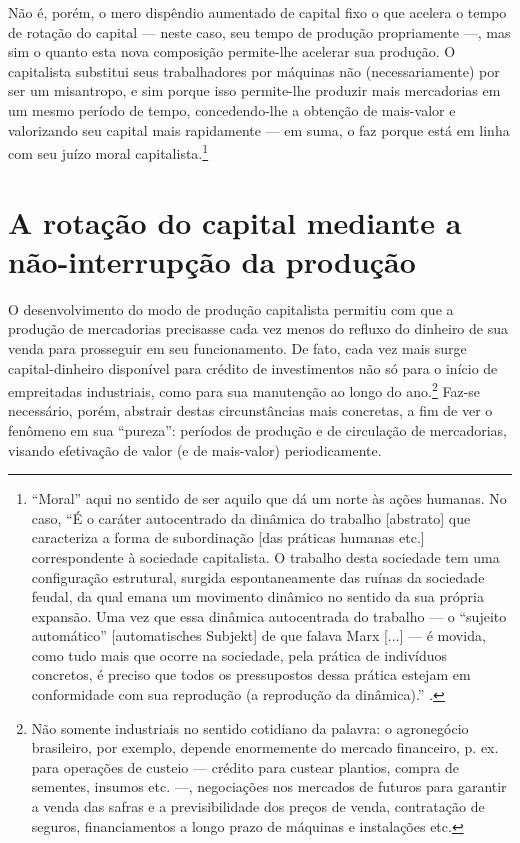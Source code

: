 Não é, porém, o mero dispêndio aumentado de capital fixo o que acelera o tempo de rotação do capital — neste caso, seu tempo de produção propriamente —, mas sim o quanto esta nova composição permite-lhe acelerar sua produção. O capitalista substitui seus trabalhadores por máquinas não (necessariamente) por ser um misantropo, e sim porque isso permite-lhe produzir mais mercadorias em um mesmo período de tempo, concedendo-lhe a obtenção de mais-valor e valorizando seu capital mais rapidamente — em suma, o faz porque está em linha com seu juízo moral capitalista.\footnote{``Moral'' aqui no sentido de ser aquilo que dá um norte às ações humanas. No caso, ``É o caráter autocentrado da dinâmica do trabalho [abstrato] que caracteriza a forma de subordinação [das práticas humanas etc.] correspondente à sociedade capitalista. O trabalho desta sociedade tem uma configuração estrutural, surgida espontaneamente das ruínas da sociedade feudal, da qual emana um movimento dinâmico no sentido da sua própria expansão. Uma vez que essa dinâmica autocentrada do trabalho — o “sujeito automático” [automatisches Subjekt] de que falava Marx [...] — é movida, como tudo mais que ocorre na sociedade, pela prática de indivíduos concretos, é preciso que todos os pressupostos dessa prática estejam em conformidade com sua reprodução (a reprodução da dinâmica).'' \parencite[p. 329]{Medeiros2013a}.}
\section{A rotação do capital mediante a não-interrupção da produção}
O desenvolvimento do modo de produção capitalista permitiu com que a produção de mercadorias precisasse cada vez menos do refluxo do dinheiro de sua venda para prosseguir em seu funcionamento. De fato, cada vez mais surge capital-dinheiro disponível para crédito de investimentos não só para o início de empreitadas industriais, como para sua manutenção ao longo do ano.\footnote{Não somente industriais no sentido cotidiano da palavra: o agronegócio brasileiro, por exemplo, depende enormemente do mercado financeiro, p. ex. para operações de custeio — crédito para custear plantios, compra de sementes, insumos etc. —, negociações nos mercados de futuros para garantir a venda das safras e a previsibilidade dos preços de venda, contratação de seguros, financiamentos a longo prazo de máquinas e instalações etc.} Faz-se necessário, porém, abstrair destas circunstâncias mais concretas, a fim de ver o fenômeno em sua ``pureza'': períodos de produção e de circulação de mercadorias, visando efetivação de valor (e de mais-valor) periodicamente.

